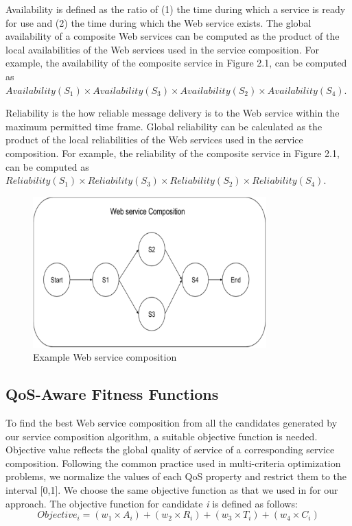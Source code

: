 Availability is defined as the ratio of (1) the time during which a service is ready for use and (2) the time during which the Web service exists. The global availability of a composite Web services can be computed as the product of the local availabilities of the Web services used in the service composition.  For example, the availability of the composite service in Figure 2.1, can be computed as $Availability(S_{1}) \times Availability(S_{3}) \times  Availability(S_{2}) \times Availability(S_{4})$. \par

Reliability is the how reliable message delivery is to the Web service within the maximum permitted time frame. Global reliability can be calculated as the product of the local reliabilities of the Web services used in the service composition. For example, the reliability of the composite service in Figure 2.1, can be computed as $Reliability(S_{1}) \times Reliability(S_{3}) \times Reliability(S_{2}) \times Reliability(S_{4})$. \par
\begin{figure}[H]
\includegraphics[width=9cm]{Figure2-1ExampleWebServiceComposition.pdf}
\centering
\caption{Example Web service composition}
\end{figure} 

\subsection {QoS-Aware Fitness Functions} \label{fitnessFunction}

To find the best Web service composition from all the candidates generated by our service composition algorithm, a suitable objective function is needed. Objective value reflects the global quality of service of a corresponding service composition. Following the common practice \cite{19,14,4} used in multi-criteria optimization problems, we normalize the values of each QoS property and restrict them to the interval [0,1]. We choose the same objective function as that we used in \cite{19,4} for our approach. The objective function for candidate \emph{i} is defined as follows:
\begin{equation}
Objective_{i}=(w_{1} \times A_{i}) + (w_{2} \times R_{i}) + (w_{3} \times T_{i}) + (w_{4} \times C_{i})
\end{equation}

